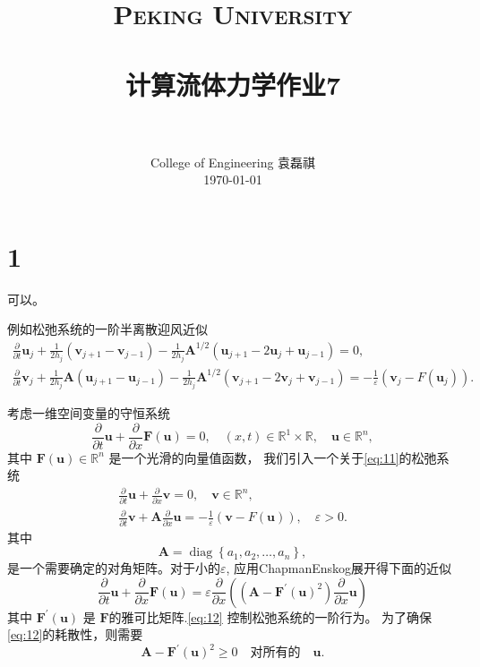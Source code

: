 \documentclass[12pt]{article}
\title{
		\vspace{-1in} 	
		\usefont{OT1}{bch}{b}{n}
		\normalfont \normalsize \textsc{\LARGE Peking University}\\[0.2cm] %
		\horrule{0.5pt} \\[0.2cm]
		\huge \bfseries{计算流体力学作业7} \\[-0.2cm]
		\horrule{2pt} \\[0.2cm]
}
\author{
		\normalfont 								\normalsize
		College of Engineering \quad 2001111690  \quad 袁磊祺\\	\normalsize
        \today
}
\date{}
\begin{document}


\maketitle

\section{1}

可以。

例如松弛系统的一阶半离散迎风近似
\begin{gather}
	\frac{\partial}{\partial t} \bm{u}_{j}+\frac{1}{2 h_{j}}\left(\bm{v}_{j+1}-\bm{v}_{j-1}\right)-\frac{1}{2 h_{j}} \bm{A}^{1 / 2}\left(\bm{u}_{j+1}-2 \bm{u}_{j}+\bm{u}_{j-1}\right)=0, \\
	\frac{\partial}{\partial t} \bm{v}_{j}+\frac{1}{2 h_{j}} \bm{A}\left(\bm{u}_{j+1}-\bm{u}_{j-1}\right)-\frac{1}{2 h_{j}} \bm{A}^{1 / 2}\left(\bm{v}_{j+1}-2 \bm{v}_{j}+\bm{v}_{j-1}\right)=-\frac{1}{\varepsilon}\left(\bm{v}_{j}-F\left(\bm{u}_{j}\right)\right).
\end{gather}


考虑一维空间变量的守恒系统
\begin{equation}
	\frac{\partial}{\partial t} \bm{u}+\frac{\partial}{\partial x} \bm{F}(\bm{u})=0, \quad(x, t) \in \mathbb{R}^{1} \times \mathbb{R}, \quad \bm{u} \in \mathbb{R}^{n},
	\label{eq:11}
\end{equation}
其中 $\bm{F}(\bm{u}) \in \mathbb{R}^{n}$ 是一个光滑的向量值函数， 我们引入一个关于\cref{eq:11}的松弛系统
\begin{gather}
\frac{\partial}{\partial t} \bm{u}+\frac{\partial}{\partial x} \bm{v}=0, \quad \bm{v} \in \mathbb{R}^{n}, \\
\frac{\partial}{\partial t} \bm{v}+\bm{A} \frac{\partial}{\partial x} \bm{u}=-\frac{1}{\varepsilon}(\bm{v}-F(\bm{u})), \quad \varepsilon>0.
\end{gather}
其中
\begin{equation}
	\bm{A}=\operatorname{diag}\left\{a_{1}, a_{2}, \ldots, a_{n}\right\},
\end{equation}
是一个需要确定的对角矩阵。对于小的$\varepsilon$, 应用ChapmanEnskog展开得下面的近似
\begin{equation}
	\frac{\partial}{\partial t} \bm{u}+\frac{\partial}{\partial x} \bm{F}(\bm{u})=\varepsilon \frac{\partial}{\partial x}\left(\left(\bm{A}-\bm{F}^{\prime}(\bm{u})^{2}\right) \frac{\partial}{\partial x} \bm{u}\right)
	\label{eq:12}
\end{equation}
其中 $\bm{F}^{\prime}(\bm{u})$ 是 $\bm{F}$的雅可比矩阵.\cref{eq:12} 控制松弛系统的一阶行为。 为了确保\cref{eq:12}的耗散性，则需要
\begin{equation}
	\bm{A}-\bm{F}^{\prime}(\bm{u})^{2} \geqslant 0 \quad \text {对所有的} \quad \bm{u}.
\end{equation}
\end{document}
